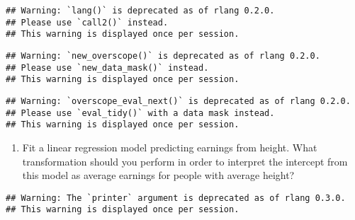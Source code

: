 \documentclass[]{article}
\newenvironment{Shaded}{\begin{snugshade}}{\end{snugshade}}
\newcommand{\CommentTok}[1]{\textcolor[rgb]{0.56,0.35,0.01}{\textit{#1}}}
\newcommand{\DataTypeTok}[1]{\textcolor[rgb]{0.13,0.29,0.53}{#1}}
\newcommand{\KeywordTok}[1]{\textcolor[rgb]{0.13,0.29,0.53}{\textbf{#1}}}
\newcommand{\NormalTok}[1]{#1}
\newcommand{\OperatorTok}[1]{\textcolor[rgb]{0.81,0.36,0.00}{\textbf{#1}}}
\newcommand{\StringTok}[1]{\textcolor[rgb]{0.31,0.60,0.02}{#1}}
\providecommand{\tightlist}{%
  \setlength{\itemsep}{0pt}\setlength{\parskip}{0pt}}
\begin{document}
\begin{verbatim}
## Warning: `lang()` is deprecated as of rlang 0.2.0.
## Please use `call2()` instead.
## This warning is displayed once per session.
\end{verbatim}

\begin{verbatim}
## Warning: `new_overscope()` is deprecated as of rlang 0.2.0.
## Please use `new_data_mask()` instead.
## This warning is displayed once per session.
\end{verbatim}

\begin{verbatim}
## Warning: `overscope_eval_next()` is deprecated as of rlang 0.2.0.
## Please use `eval_tidy()` with a data mask instead.
## This warning is displayed once per session.
\end{verbatim}

\begin{Shaded}
\end{Shaded}

\begin{enumerate}
\def\labelenumi{\arabic{enumi}.}
\setcounter{enumi}{1}
\tightlist
\item
  Fit a linear regression model predicting earnings from height. What
  transformation should you perform in order to interpret the intercept
  from this model as average earnings for people with average height?
\end{enumerate}

\begin{Shaded}
\end{Shaded}

\begin{verbatim}
## Warning: The `printer` argument is deprecated as of rlang 0.3.0.
## This warning is displayed once per session.
\end{verbatim}
\end{document}
